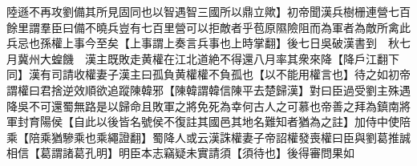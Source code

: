 陸遜不再攻劉備其所見固同也以智遇智三國所以鼎立歟】初帝聞漢兵樹栅連營七百餘里謂羣臣曰備不曉兵豈有七百里營可以拒敵者乎苞原隰險阻而為軍者為敵所禽此兵忌也孫權上事今至矣【上事謂上奏言兵事也上時掌翻】後七日吳破漢書到　秋七月冀州大蝗饑　漢主既敗走黄權在江北道絶不得還八月率其衆來降【降戶江翻下同】漢有司請收權妻子漢主曰孤負黄權權不負孤也【以不能用權言也】待之如初帝謂權曰君捨逆效順欲追蹤陳韓邪【陳韓謂韓信陳平去楚歸漢】對曰臣過受劉主殊遇降吳不可還蜀無路是以歸命且敗軍之將免死為幸何古人之可慕也帝善之拜為鎮南將軍封育陽侯【自此以後皆名號侯不復註其國邑其地名難知者猶為之註】加侍中使陪乘【陪乘猶驂乘也乘繩證翻】蜀降人或云漢誅權妻子帝詔權發喪權曰臣與劉葛推誠相信【葛謂諸葛孔明】明臣本志竊疑未實請須【須待也】後得審問果如